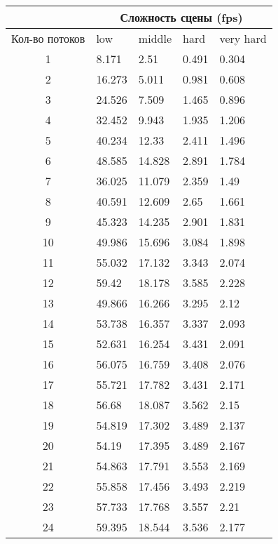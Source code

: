 \begin{center}
\begin{longtable}{|c|p{2cm}|p{2cm}|p{2cm}|p{2cm}|}
\hline & \multicolumn{4}{c|}{Сложность сцены (fps)} \\ 
\hline Кол-во потоков & low & middle & hard &  very hard\\ 
\hline 1 &  8.171 & 2.51 & 0.491 & 0.304 \\ 
\hline 2 &  16.273 & 5.011 & 0.981 & 0.608 \\ 
\hline 3 &  24.526 & 7.509 & 1.465 & 0.896 \\ 
\hline 4 &  32.452 & 9.943 & 1.935 & 1.206 \\ 
\hline 5 &  40.234 & 12.33 & 2.411 & 1.496 \\ 
\hline 6 &  48.585 & 14.828 & 2.891 & 1.784 \\ 
\hline 7 &  36.025 & 11.079 & 2.359 & 1.49 \\ 
\hline 8 &  40.591 & 12.609 & 2.65 & 1.661 \\ 
\hline 9 &  45.323 & 14.235 & 2.901 & 1.831 \\ 
\hline 10 &  49.986 & 15.696 & 3.084 & 1.898 \\ 
\hline 11 &  55.032 & 17.132 & 3.343 & 2.074 \\ 
\hline 12 &  59.42 & 18.178 & 3.585 & 2.228 \\ 
\hline 13 &  49.866 & 16.266 & 3.295 & 2.12 \\ 
\hline 14 &  53.738 & 16.357 & 3.337 & 2.093 \\ 
\hline 15 &  52.631 & 16.254 & 3.431 & 2.091 \\ 
\hline 16 &  56.075 & 16.759 & 3.408 & 2.076 \\ 
\hline 17 &  55.721 & 17.782 & 3.431 & 2.171 \\ 
\hline 18 &  56.68 & 18.087 & 3.562 & 2.15 \\ 
\hline 19 &  54.819 & 17.302 & 3.489 & 2.137 \\ 
\hline 20 &  54.19 & 17.395 & 3.489 & 2.167 \\ 
\hline 21 &  54.863 & 17.791 & 3.553 & 2.169 \\ 
\hline 22 &  55.858 & 17.456 & 3.493 & 2.219 \\ 
\hline 23 &  57.733 & 17.768 & 3.557 & 2.21 \\ 
\hline 24 &  59.395 & 18.544 & 3.536 & 2.177 \\ 
\hline
\end{longtable}
\end{center}

